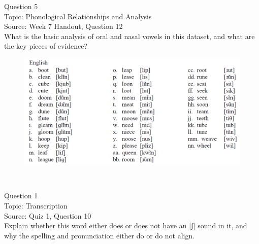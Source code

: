 \documentclass[12pt]{article}
\begin{document}
\newpage

{\large Question 5}\\

Topic: Phonological Relationships and Analysis\\
Source: Week 7 Handout, Question 12\\

What is the basic analysis of oral and nasal vowels in this dataset, and what are the key pieces of evidence?\\

\begin{figure}[H]
\includegraphics{../images/english12.png}
\end{figure}

\newpage

\begin{center}
\textbf{{\color{red}{\HUGE END OF EXAM}}}\\

\end{center}
\newpage

\begin{center}
\textbf{{\color{blue}{\HUGE START OF EXAM\\}}}

\textbf{{\color{blue}{\HUGE Student ID: 13570\\}}}

\textbf{{\color{blue}{\HUGE \\}}}

\end{center}
\newpage

{\large Question 1}\\

Topic: Transcription\\
Source: Quiz 1, Question 10\\

Explain whether this word either does or does not have an [ʃ] sound in it, and why the spelling and pronunciation either do or do not align.\\
\end{document}
